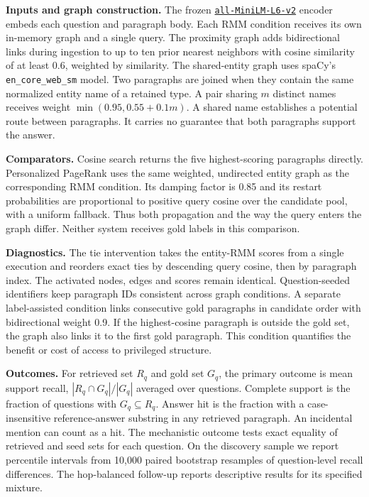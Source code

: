 \documentclass[11pt,a4paper]{article}
\begin{document}
\textbf{Inputs and graph construction.} The frozen \href{https://huggingface.co/sentence-transformers/all-MiniLM-L6-v2}{\texttt{all-MiniLM-L6-v2}} encoder embeds each question and paragraph body. Each RMM condition receives its own in-memory graph and a single query. The proximity graph adds bidirectional links during ingestion to up to ten prior nearest neighbors with cosine similarity of at least 0.6, weighted by similarity. The shared-entity graph uses spaCy's \texttt{en\_core\_web\_sm} model. Two paragraphs are joined when they contain the same normalized entity name of a retained type. A pair sharing $m$ distinct names receives weight $\min(0.95,0.55+0.1m)$. A shared name establishes a potential route between paragraphs. It carries no guarantee that both paragraphs support the answer.

\textbf{Comparators.} Cosine search returns the five highest-scoring paragraphs directly. Personalized PageRank uses the same weighted, undirected entity graph as the corresponding RMM condition. Its damping factor is 0.85 and its restart probabilities are proportional to positive query cosine over the candidate pool, with a uniform fallback. Thus both propagation and the way the query enters the graph differ. Neither system receives gold labels in this comparison.

\textbf{Diagnostics.} The tie intervention takes the entity-RMM scores from a single execution and reorders exact ties by descending query cosine, then by paragraph index. The activated nodes, edges and scores remain identical. Question-seeded identifiers keep paragraph IDs consistent across graph conditions. A separate label-assisted condition links consecutive gold paragraphs in candidate order with bidirectional weight 0.9. If the highest-cosine paragraph is outside the gold set, the graph also links it to the first gold paragraph. This condition quantifies the benefit or cost of access to privileged structure.

\textbf{Outcomes.} For retrieved set $R_q$ and gold set $G_q$, the primary outcome is mean support recall, $|R_q\cap G_q|/|G_q|$ averaged over questions. Complete support is the fraction of questions with $G_q\subseteq R_q$. Answer hit is the fraction with a case-insensitive reference-answer substring in any retrieved paragraph. An incidental mention can count as a hit. The mechanistic outcome tests exact equality of retrieved and seed sets for each question. On the discovery sample we report percentile intervals from 10,000 paired bootstrap resamples of question-level recall differences. The hop-balanced follow-up reports descriptive results for its specified mixture.
\end{document}
